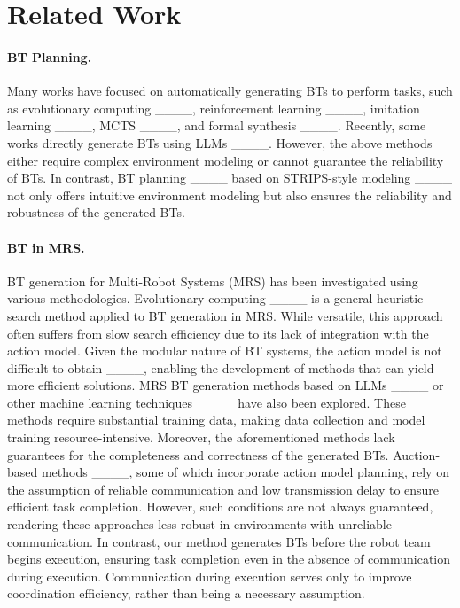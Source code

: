 \section{Related Work}
\paragraph{BT Planning.}
Many works have focused on automatically generating BTs to perform tasks, such as evolutionary computing ____, reinforcement learning ____, imitation learning ____, MCTS ____, and formal synthesis ____. Recently, some works directly generate BTs using LLMs ____. However, the above methods either require complex environment modeling or cannot guarantee the reliability of BTs. In contrast, BT planning ____ based on STRIPS-style modeling ____ not only offers intuitive environment modeling but also ensures the reliability and robustness of the generated BTs. 



\paragraph{BT in MRS.}
BT generation for Multi-Robot Systems (MRS) has been investigated using various methodologies. Evolutionary computing ____ is a general heuristic search method applied to BT generation in MRS. While versatile, this approach often suffers from slow search efficiency due to its lack of integration with the action model. Given the modular nature of BT systems, the action model is not difficult to obtain ____, enabling the development of methods that can yield more efficient solutions. MRS BT generation methods based on LLMs ____ or other machine learning techniques ____ have also been explored. These methods require substantial training data, making data collection and model training resource-intensive. Moreover, the aforementioned methods lack guarantees for the completeness and correctness of the generated BTs. Auction-based methods ____, some of which incorporate action model planning, rely on the assumption of reliable communication and low transmission delay to ensure efficient task completion. However, such conditions are not always guaranteed, rendering these approaches less robust in environments with unreliable communication. In contrast, our method generates BTs before the robot team begins execution, ensuring task completion even in the absence of communication during execution. Communication during execution serves only to improve coordination efficiency, rather than being a necessary assumption.




